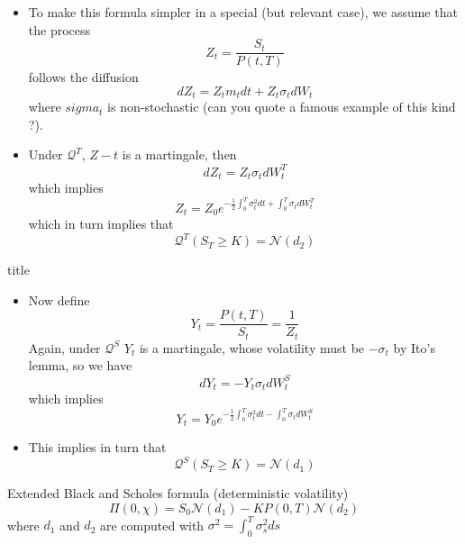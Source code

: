 \documentclass{beamer}
\begin{document}
\begin{frame}
\begin{itemize}
\item To make this formula simpler in a special (but relevant case), we assume that the process 
\begin{equation}
Z_t = \frac{S_t}{P(t,T)}
\end{equation}
follows the diffusion
\begin{equation}
dZ_t = Z_tm_tdt + Z_t\sigma_tdW_t
\end{equation}
where $sigma_t$ is non-stochastic (can you quote a famous example of this kind ?).
\item Under $\mathcal{Q}^T$, $Z-t$ is a martingale, then
\begin{equation}
	dZ_t = Z_t\sigma_tdW^T_t
\end{equation}
which implies
\begin{equation}
Z_t = Z_0 e^{-\frac{1}{2}\int_0^T\sigma_t^2 dt + \int_0^T\sigma_tdW^T_t}
\end{equation}
which in turn implies that
\begin{equation}
\mathcal{Q}^T(S_T\geq K) = \mathcal{N}(d_2)
\end{equation}
\end{itemize}
\end{frame}


\begin{frame}{title}
\begin{itemize}
	\item Now define
	\begin{equation}
		Y_t = \frac{P(t,T)}{S_t}=\frac{1}{Z_t}
	\end{equation}
Again, under $\mathcal{Q}^S$ $Y_t$ is a martingale, whose volatility must be $-\sigma_t$ by Ito's lemma, so we have
\begin{equation}
	dY_t = -Y_t\sigma_tdW^S_t
\end{equation} 
which implies
\begin{equation}
Y_t = Y_0 e^{-\frac{1}{2}\int_0^T\sigma_t^2 dt - \int_0^T\sigma_tdW^S_t}
\end{equation}
\item This implies in turn that
\begin{equation}
\mathcal{Q}^S(S_T\geq K) = \mathcal{N}(d_1)
\end{equation}
\end{itemize}
\end{frame}


\begin{frame}
\begin{block}{Extended Black and Scholes formula (deterministic volatility)}
\begin{equation}
\Pi(0,\chi) = S_0\mathcal{N}(d_1) - KP(0,T)\mathcal{N}(d_2)
\end{equation}
where $d_1$ and $d_2$ are computed with $\sigma^2 = \int_0^T \sigma_s^2 ds$
\end{block}
\end{frame}
\end{document}
